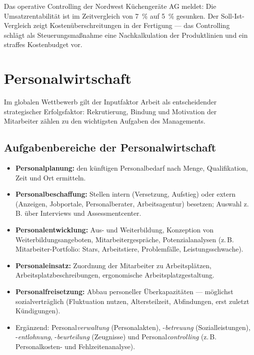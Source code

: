\documentclass[11pt, a4paper]{article}
\begin{document}
\begin{beispiel}
Das operative Controlling der Nordwest Küchengeräte AG meldet: Die Umsatzrentabilität
ist im Zeitvergleich von 7~\% auf 5~\% gesunken. Der Soll-Ist-Vergleich zeigt
Kostenüberschreitungen in der Fertigung --- das Controlling schlägt als Steuerungsmaßnahme
eine Nachkalkulation der Produktlinien und ein straffes Kostenbudget vor.
\end{beispiel}

\section{Personalwirtschaft}

Im globalen Wettbewerb gilt der Inputfaktor Arbeit als entscheidender strategischer
Erfolgsfaktor: Rekrutierung, Bindung und Motivation der Mitarbeiter zählen zu den
wichtigsten Aufgaben des Managements.

\subsection{Aufgabenbereiche der Personalwirtschaft}

\begin{itemize}
  \item \textbf{Personalplanung:} den künftigen Personalbedarf nach Menge, Qualifikation,
    Zeit und Ort ermitteln.
  \item \textbf{Personalbeschaffung:} Stellen intern (Versetzung, Aufstieg) oder extern
    (Anzeigen, Jobportale, Personalberater, Arbeitsagentur) besetzen; Auswahl z.\,B. über
    Interviews und Assessmentcenter.
  \item \textbf{Personalentwicklung:} Aus- und Weiterbildung, Konzeption von
    Weiterbildungsangeboten, Mitarbeitergespräche, Potenzialanalysen
    (z.\,B. Mitarbeiter-Portfolio: Stars, Arbeitstiere, Problemfälle, Leistungsschwache).
  \item \textbf{Personaleinsatz:} Zuordnung der Mitarbeiter zu Arbeitsplätzen,
    Arbeitsplatzbeschreibungen, ergonomische Arbeitsplatzgestaltung.
  \item \textbf{Personalfreisetzung:} Abbau personeller Überkapazitäten --- möglichst
    sozialverträglich (Fluktuation nutzen, Altersteilzeit, Abfindungen, erst zuletzt
    Kündigungen).
  \item Ergänzend: Personal\emph{verwaltung} (Personalakten), -\emph{betreuung}
    (Sozialleistungen), -\emph{entlohnung}, -\emph{beurteilung} (Zeugnisse) und
    Personal\emph{controlling} (z.\,B. Personalkosten- und Fehlzeitenanalyse).
\end{itemize}
\end{document}

